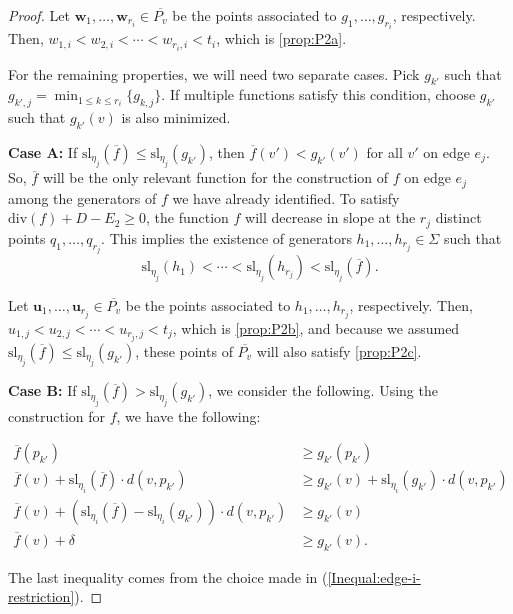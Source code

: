 \documentclass{amsart}
\begin{document}
\begin{proof}
		Let $\mathbf{w}_1, \ldots, \mathbf{w}_{r_i} \in \overline{P_v}$ be the points associated to $g_1, \ldots, g_{r_i}$, respectively. Then, $w_{1,i} < w_{2,i} < \cdots < w_{r_i, i} < t_i$, which is \ref{prop:P2a}.
		
		For the remaining properties, we will need two separate cases. Pick $g_{k'}$ such that $g_{k',j} = \min_{1 \leq k \leq r_i} \{ g_{k,j} \}$. If multiple functions satisfy this condition, choose $g_{k'}$ such that $g_{k'}(v)$ is also minimized.
		
		\textbf{Case A:} If $\mathrm{sl}_{\eta_j}(\overline{f}) \leq \mathrm{sl}_{\eta_j}(g_{k'})$, then $\overline{f}(v') < g_{k'}(v')$ for all $v'$ on edge $e_j$. So, $\overline{f}$ will be the only relevant function for the construction of $f$ on edge $e_j$ among the generators of $f$ we have already identified. To satisfy $\mathrm{div}(f) + D - E_2 \geq 0$, the function $f$ will decrease in slope at the $r_j$ distinct points $q_1, \ldots, q_{r_j}$. This implies the existence of generators $h_1, \ldots, h_{r_j} \in \Sigma$ such that $$\mathrm{sl}_{\eta_j}(h_1) < \cdots < \mathrm{sl}_{\eta_j}(h_{r_j}) < \mathrm{sl}_{\eta_j}(\overline{f}).$$
		
		Let $\mathbf{u}_1, \ldots, \mathbf{u}_{r_j} \in \overline{P_v}$ be the points associated to $h_1, \ldots, h_{r_j}$, respectively. Then, $u_{1,j} < u_{2,j} < \cdots < u_{r_j, j} < t_j$, which is \ref{prop:P2b}, and because we assumed $\mathrm{sl}_{\eta_j}(\overline{f}) \leq \mathrm{sl}_{\eta_j}(g_{k'})$, these points of $\overline{P_v}$ will also satisfy \ref{prop:P2c}.
		
		\textbf{Case B:} If $\mathrm{sl}_{\eta_j}(\overline{f}) > \mathrm{sl}_{\eta_j}(g_{k'})$, we consider the following. Using the construction for $f$, we have the following:
		
		\begin{align*}
			\overline{f}(p_{k'}) & \geq g_{k'}(p_{k'}) \\
			\overline{f}(v) + \mathrm{sl}_{\eta_i} (\overline{f}) \cdot d(v,p_{k'}) & \geq g_{k'}(v) + \mathrm{sl}_{\eta_i} (g_{k'}) \cdot d(v,p_{k'}) \\
			\overline{f}(v) + (\mathrm{sl}_{\eta_i} (\overline{f}) - \mathrm{sl}_{\eta_i} (g_{k'})) \cdot d(v,p_{k'}) & \geq g_{k'}(v) \\
			\overline{f}(v) + \delta & \geq g_{k'}(v).
		\end{align*}
		
		\noindent The last inequality comes from the choice made in (\ref{Inequal:edge-i-restriction}).
		

\end{proof}
\end{document}
